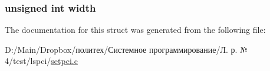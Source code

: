 \subsubsection[{\texorpdfstring{width}{width}}]{\setlength{\rightskip}{0pt plus 5cm}unsigned int width}\hypertarget{structreg__name_aca34d28e3d8bcbcadb8edb4e3af24f8c}{}\label{structreg__name_aca34d28e3d8bcbcadb8edb4e3af24f8c}


The documentation for this struct was generated from the following file\+:\begin{DoxyCompactItemize}
\item 
D\+:/\+Main/\+Dropbox/политех/Системное программирование/Л. р. № 4/test/lspci/\hyperlink{setpci_8c}{setpci.\+c}\end{DoxyCompactItemize}
